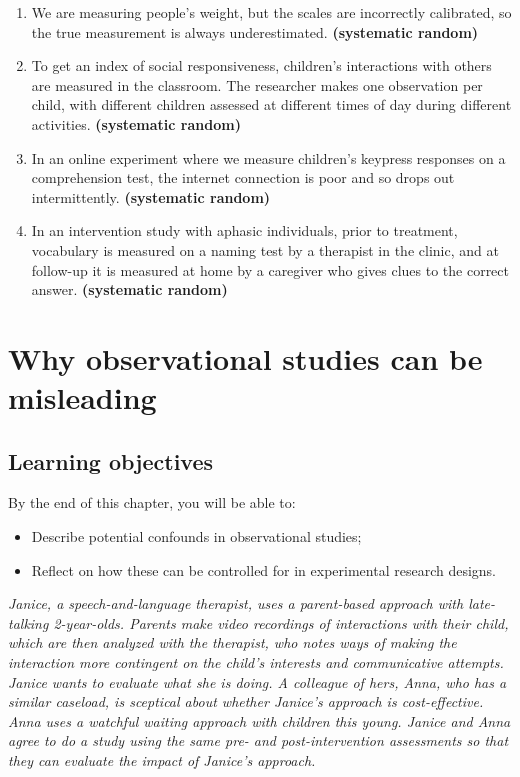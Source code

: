 \documentclass{krantz}
\providecommand{\tightlist}{%
\setlength{\itemsep}{0pt}\setlength{\parskip}{0pt}}
\begin{document}
\begin{enumerate}
\def\labelenumi{\arabic{enumi}.}
\tightlist
\item
  We are measuring people's weight, but the scales are incorrectly calibrated, so the true measurement is always underestimated. \textbf{(systematic \textbar{} random)}\\
\item
  To get an index of social responsiveness, children's interactions with others are measured in the classroom. The researcher makes one observation per child, with different children assessed at different times of day during different activities. \textbf{(systematic \textbar{} random)}\\
\item
  In an online experiment where we measure children's keypress responses on a comprehension test, the internet connection is poor and so drops out intermittently. \textbf{(systematic \textbar{} random)}\\
\item
  In an intervention study with aphasic individuals, prior to treatment, vocabulary is measured on a naming test by a therapist in the clinic, and at follow-up it is measured at home by a caregiver who gives clues to the correct answer. \textbf{(systematic \textbar{} random)}
\end{enumerate}

\hypertarget{observations}{%
\chapter{Why observational studies can be misleading}\label{observations}}

\hypertarget{learning-objectives-1}{%
\section{Learning objectives}\label{learning-objectives-1}}

By the end of this chapter, you will be able to:

\begin{itemize}
\item
  Describe potential confounds in observational studies;
\item
  Reflect on how these can be controlled for in experimental research designs.
\end{itemize}

\begin{shaded}
\textit{Janice, a speech-and-language therapist, uses a parent-based approach with late-talking 2-year-olds. Parents make video recordings of interactions with their child, which are then analyzed with the therapist, who notes ways of making the interaction more contingent on the child's interests and communicative attempts. Janice wants to evaluate what she is doing. A colleague of hers, Anna, who has a similar caseload, is sceptical about whether Janice's approach is cost-effective. Anna uses a watchful waiting approach with children this young. Janice and Anna agree to do a study using the same pre- and post-intervention assessments so that they can evaluate the impact of Janice's approach.}  
\end{shaded}
\end{document}
